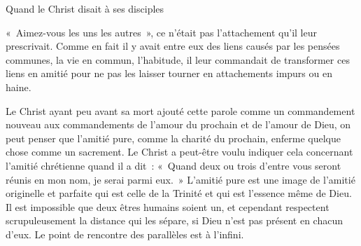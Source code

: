\documentclass[french,twoside]{book} %
\begin{document}
Quand le Christ disait à ses disciples\par
« Aimez-vous les uns les autres », ce n'était pas l'attachement qu'il leur prescrivait. Comme en fait il y avait entre eux des liens causés par les pensées communes, la vie en commun, l'habitude, il leur commandait de transformer ces liens en amitié pour ne pas les laisser tourner en attachements impurs ou en haine.\par
Le Christ ayant peu avant sa mort ajouté cette parole comme un commandement nouveau aux commandements de l'amour du prochain et de l'amour de Dieu, on peut penser que l'amitié pure, comme la charité du prochain, enferme quelque chose comme un sacrement. Le Christ a peut-être voulu indiquer cela concernant l'amitié chrétienne quand il a dit : « Quand deux ou trois d'entre vous seront réunis en mon nom, je serai parmi eux. » L'amitié pure est une image de l'amitié originelle et parfaite qui est celle de la Trinité et qui est l'essence même de Dieu. Il est impossible que deux êtres humains soient un, et cependant respectent scrupuleusement la distance qui les sépare, si Dieu n'est pas présent en chacun d'eux. Le point de rencontre des parallèles est à l'infini.
\end{document}
